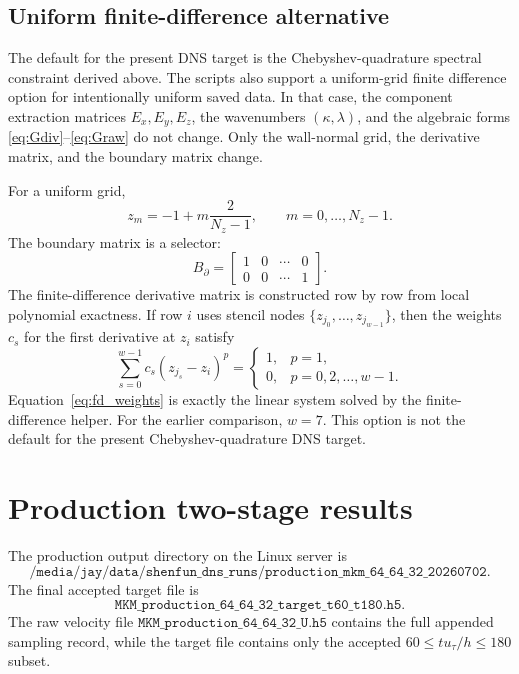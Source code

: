 \documentclass[11pt]{article}
\newcommand{\Ez}{E_z}
\newcommand{\Ex}{E_x}
\newcommand{\Ey}{E_y}
\newcommand{\Bbdry}{B_{\partial}}
\begin{document}
\subsection{Uniform finite-difference alternative}

The default for the present DNS target is the Chebyshev-quadrature spectral
constraint derived above. The scripts also support a uniform-grid finite
difference option for intentionally uniform saved data. In that case, the
component extraction matrices \(\Ex,\Ey,\Ez\), the wavenumbers
\((\kappa,\lambda)\), and the algebraic forms
\eqref{eq:Gdiv}--\eqref{eq:Graw} do not change. Only the wall-normal grid, the
derivative matrix, and the boundary matrix change.

For a uniform grid,
\[
  z_m = -1 + m\frac{2}{N_z-1},\qquad m=0,\ldots,N_z-1.
\]
The boundary matrix is a selector:
\[
  \Bbdry =
  \begin{bmatrix}
    1 & 0 & \cdots & 0\\
    0 & 0 & \cdots & 1
  \end{bmatrix}.
\]
The finite-difference derivative matrix is constructed row by row from local
polynomial exactness. If row \(i\) uses stencil nodes
\(\{z_{j_0},\ldots,z_{j_{w-1}}\}\), then the weights \(c_s\) for the first
derivative at \(z_i\) satisfy
\begin{equation}
  \sum_{s=0}^{w-1} c_s(z_{j_s}-z_i)^p
  =
  \begin{cases}
    1, & p=1,\\
    0, & p=0,2,\ldots,w-1.
  \end{cases}
  \label{eq:fd_weights}
\end{equation}
Equation~\eqref{eq:fd_weights} is exactly the linear system solved by the
finite-difference helper. For the earlier comparison, \(w=7\). This option is
not the default for the present Chebyshev-quadrature DNS target.

\section{Production two-stage results}
\label{sec:production_results}

The production output directory on the Linux server is
\[
  \texttt{/media/jay/data/shenfun\_dns\_runs/production\_mkm\_64\_64\_32\_20260702}.
\]
The final accepted target file is
\[
  \texttt{MKM\_production\_64\_64\_32\_target\_t60\_t180.h5}.
\]
The raw velocity file
\(\texttt{MKM\_production\_64\_64\_32\_U.h5}\) contains the full appended
sampling record, while the target file contains only the accepted
\(60\le t u_{\tau}/h\le180\) subset.
\end{document}
